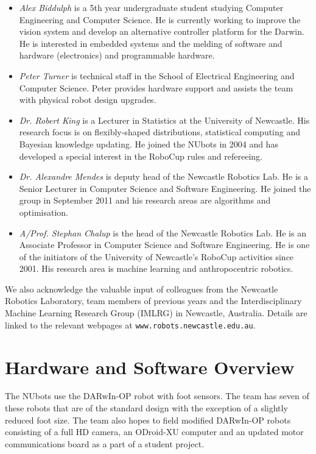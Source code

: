\documentclass{llncs}
\begin{document}
\begin{itemize}
\item \emph{Alex Biddulph} is a 5th year undergraduate student studying Computer Engineering and Computer Science. He is currently working to improve the vision system and develop an alternative controller platform for the Darwin.
He is interested in embedded systems and the melding of software and hardware (electronics) and programmable hardware.

\item \emph{Peter Turner} is technical staff in the School of Electrical Engineering and Computer Science. Peter provides hardware support and assists the team with physical robot design upgrades. %

\item \emph{Dr. Robert King} is a Lecturer in Statistics at the University of Newcastle. His research focus is on flexibly-shaped distributions, statistical computing and Bayesian knowledge updating. He joined the NUbots in 2004 and has developed a special interest in the RoboCup rules and refereeing.

\item \emph{Dr. Alexandre Mendes} is deputy head of the Newcastle Robotics Lab. He is a Senior Lecturer in Computer Science and Software Engineering. He joined the group in September 2011 and his research areas are algorithms and optimisation.

\item \emph{A/Prof. Stephan Chalup} is the head of the Newcastle Robotics Lab. He is an Associate Professor in Computer Science and Software Engineering. He is one of the initiators of the University of Newcastle's RoboCup activities since 2001. His research area is machine learning and anthropocentric robotics.
\end{itemize}
We also acknowledge the valuable input of colleagues from the Newcastle Robotics Laboratory, team members of previous years
and the Interdisciplinary Machine Learning Research Group (IMLRG) in
Newcastle, Australia. Details are linked to the relevant webpages at
\texttt{www.robots.newcastle.edu.au}.


\section{Hardware and Software Overview}
The NUbots use the DARwIn-OP robot with foot sensors. The team has seven of these robots that are of the standard design with the exception of a slightly reduced foot size. The team also hopes to field modified DARwIn-OP robots consisting of a full HD camera, an ODroid-XU computer and an updated motor communications board as a part of a student project. %
\end{document}
